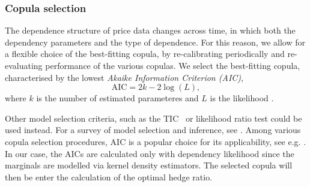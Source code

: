 
\subsubsection{Copula selection}\label{subsec:copula-selection}
The dependence structure of price data changes across time, in which
both the dependency parameters and the type of dependence.
For this reason, we allow for a flexible choice of the best-fitting copula, by re-calibrating periodically and re-evaluating performance of the various copulas.
We select the best-fitting copula, characterised by the lowest {\em Akaike Information Criterion (AIC)},
\begin{equation*}
 \text{AIC} = 2k- 2 \log(L),
\end{equation*}
where $k$ is the number of estimated
parameteres and $L$ is the likelihood \citep{Akaike1973}. 

Other model selection criteria, such as the TIC~\citep{takeuchi1976distribution} or likelihood ratio test could be used instead.
For a survey of model selection and inference, see \cite{anderson1998comparison}.
Among various copula selection procedures, AIC is a popular choice for
its applicability, see e.g. \cite{breymann2003dependence}.
In our case, the AICs are calculated only with dependency likelihood
since the marginals are modelled via kernel density estimators.
The selected copula will then be enter the calculation of the optimal
hedge ratio.


